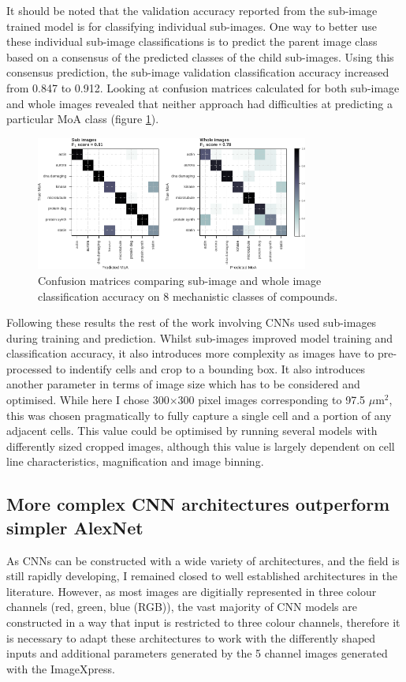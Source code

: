 \documentclass[a4paper,11pt,twoside,openright]{scrbook}
\begin{document}
It should be noted that the validation accuracy reported from the sub-image trained model is for classifying individual sub-images.
One way to better use these individual sub-image classifications is to predict the parent image class based on a consensus of the predicted classes of the child sub-images.
Using this consensus prediction, the sub-image validation classification accuracy increased from 0.847 to 0.912.
Looking at confusion matrices calculated for both sub-image and whole images revealed that neither approach had difficulties at predicting a particular MoA class (figure \ref{figure:nn_chopped_vs_whole_cm}).


\begin{figure}
    \includegraphics[width=0.8\textwidth]{ch2choppedWholeCM}
    \captionsetup{width=0.8\textwidth}
    \caption[Sub image and whole image confusion matrices]{
Confusion matrices comparing sub-image and whole image classification accuracy on 8 mechanistic classes of compounds.
}
    \label{figure:nn_chopped_vs_whole_cm}
\end{figure}

Following these results the rest of the work involving CNNs used sub-images during training and prediction.
Whilst sub-images improved model training and classification accuracy, it also introduces more complexity as images have to pre-processed to indentify cells and crop to a bounding box.
It also introduces another parameter in terms of image size which has to be considered and optimised.
While here I chose 300$\times$300 pixel images corresponding to 97.5 $\mu$m$^2$, this was chosen pragmatically to fully capture a single cell and a portion of any adjacent cells.
This value could be optimised by running several models with differently sized cropped images, although this value is largely dependent on cell line characteristics, magnification and image binning.


\subsection{More complex CNN architectures outperform simpler AlexNet}
As CNNs can be constructed with a wide variety of architectures, and the field is still rapidly developing, I remained closed to well established architectures in the literature.
However, as most images are digitially represented in three colour channels (red, green, blue (RGB)), the vast majority of CNN models are constructed in a way that input is restricted to three colour channels, therefore it is necessary to adapt these architectures to work with the differently shaped inputs and additional parameters generated by the 5 channel images generated with the ImageXpress.
\end{document}
